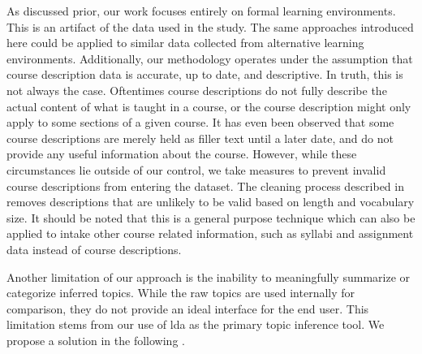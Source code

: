 
As discussed prior, our work focuses entirely on formal learning environments.
This is an artifact of the data used in the study.
The same approaches introduced here could be applied to similar data collected from alternative learning environments.
Additionally, our methodology operates under the assumption that course description data is accurate, up to date, and descriptive.
In truth, this is not always the case.
Oftentimes course descriptions do not fully describe the actual content of what is taught in a course, or the course description might only apply to some sections of a given course.
It has even been observed that some course descriptions are merely held as filler text until a later date, and do not provide any useful information about the course.
However, while these circumstances lie outside of our control, we take measures to prevent invalid course descriptions from entering the dataset.
The cleaning process described in  removes descriptions that are unlikely to be valid based on length and vocabulary size.
It should be noted that this is a general purpose technique which can also be applied to intake other course related information, such as syllabi and assignment data instead of course descriptions.


Another limitation of our approach is the inability to meaningfully summarize or categorize inferred topics.
While the raw topics are used internally for comparison, they do not provide an ideal interface for the end user.
This limitation stems from our use of \ac{lda} as the primary topic inference tool.
We propose a solution in the following .

